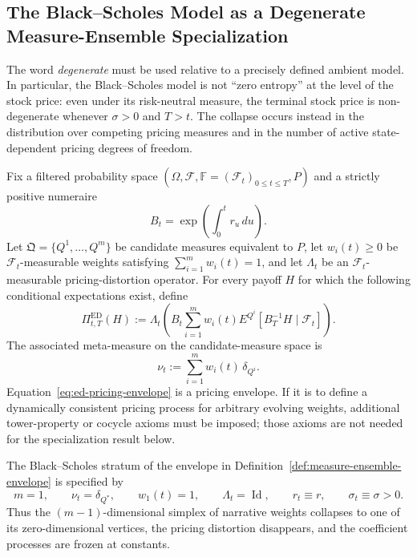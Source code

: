 
\subsection{The Black--Scholes Model as a Degenerate Measure-Ensemble Specialization}
\label{subsec:bs-degenerate-specialization}

The word \emph{degenerate} must be used relative to a precisely defined ambient
model.  In particular, the Black--Scholes model is not ``zero entropy'' at the
level of the stock price: even under its risk-neutral measure, the terminal
stock price is non-degenerate whenever $\sigma>0$ and $T>t$.  The collapse occurs
instead in the distribution over competing pricing measures and in the number
of active state-dependent pricing degrees of freedom.

\begin{definition}
\label{def:measure-ensemble-envelope}
Fix a filtered probability space
$(\Omega,\mathcal F,\mathbb F=(\mathcal F_t)_{0\leq t\leq T},P)$ and a strictly
positive numeraire
\[
  B_t=\exp\!\left(\int_0^t r_u\,du\right).
\]
Let $\mathfrak Q=\{Q^1,\ldots,Q^m\}$ be candidate measures equivalent to $P$,
let $w_i(t)\geq0$ be $\mathcal F_t$-measurable weights satisfying
$\sum_{i=1}^m w_i(t)=1$, and let $\Lambda_t$ be an $\mathcal F_t$-measurable
pricing-distortion operator.  For every payoff $H$ for which the following
conditional expectations exist, define
\begin{equation}
  \Pi^{\mathrm{ED}}_{t,T}(H)
  :=\Lambda_t\!\left(
       B_t\sum_{i=1}^m w_i(t)
       E^{Q^i}\!\left[B_T^{-1}H\mid\mathcal F_t\right]
     \right).
  \label{eq:ed-pricing-envelope}
\end{equation}
The associated meta-measure on the candidate-measure space is
\begin{equation}
  \nu_t:=\sum_{i=1}^m w_i(t)\,\delta_{Q^i}.
  \label{eq:meta-measure}
\end{equation}
Equation~\eqref{eq:ed-pricing-envelope} is a pricing envelope.  If it is to
define a dynamically consistent pricing process for arbitrary evolving
weights, additional tower-property or cocycle axioms must be imposed; those
axioms are not needed for the specialization result below.
\end{definition}

\begin{definition}
\label{def:bs-stratum}
The Black--Scholes stratum of the envelope in
Definition~\ref{def:measure-ensemble-envelope} is specified by
\begin{equation}
  m=1,\qquad \nu_t=\delta_{Q^*},\qquad w_1(t)=1,
  \qquad \Lambda_t=\operatorname{Id},
  \qquad r_t\equiv r,\qquad \sigma_t\equiv\sigma>0.
  \label{eq:bs-stratum}
\end{equation}
Thus the $(m-1)$-dimensional simplex of narrative weights collapses to one of
its zero-dimensional vertices, the pricing distortion disappears, and the
coefficient processes are frozen at constants.
\end{definition}

